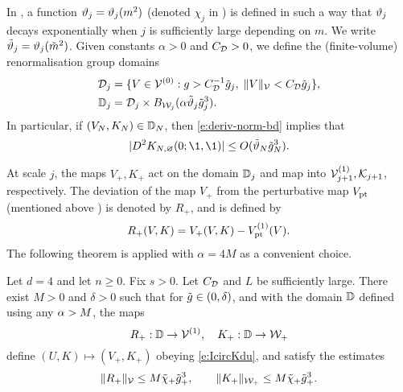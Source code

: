 In \cite[\eqref{log-e:mass-scale}--\eqref{log-e:chidef}]{BBS-saw4-log},
a function $\vartheta_j = \vartheta_j(m^2)$ (denoted $\chi_j$ in \cite{BBS-saw4-log})
is defined in such a way that $\vartheta_j$ decays exponentially
when $j$ is sufficiently large depending on $m$.
We write $\tilde{\vartheta}_j = \vartheta_j(\tilde{m}^2)$.
Given constants $\alpha > 0$ and $C_{\mathcal{D}} > 0$,
we define the (finite-volume)
renormalisation group domains
\begin{align}
\label{e:DVdef}
\mathcal{D}_j
	&=
\{ V\in \mathcal{V}^{(0)} :
	g> C_{\mathcal{D}}^{-1} \tilde{g}_j  , \;  \|V\|_{\mathcal{V}} < C_{\mathcal{D}} \tilde{g}_j \}, \\
\label{e:domRG}
\mathbb{D}_j
	&=
\mathcal{D}_j \times B_{\mathcal{W}_j}(\alpha \tilde{\vartheta}_j \tilde{g}_j^3).
\end{align}
In particular, if $(V_N, K_N) \in \mathbb{D}_N$, then \eqref{e:deriv-norm-bd} implies that
\begin{equation}
\label{e:Kderiv-bd}
|D^2 K_{N,\varnothing}(0; \1, \1)|
	\le
O(\chicCovgen_N \ggen_N^3).
\end{equation}

At scale $j$, the maps $V_+,K_+$ act on the domain $\mathbb{D}_j$
and map into $\mathcal{V}_{j+1}^{(1)},\mathcal{K}_{j+1}$, respectively.
The deviation of the map $V_+$ from the perturbative map $V_{\rm pt}$ (mentioned above )
is denoted by $R_+$, and is defined by
\begin{equation}
\label{e:Rplusdef}
    R_+(V,K) = V_+(V,K) -V_{\rm pt}^{(1)}(V).
\end{equation}
The following theorem is applied with $\alpha =4M$ as a convenient choice.

\begin{theorem}
\label{thm:step-mr-fv}
Let $d = 4$ and let $n \ge 0$. Fix $s > 0$.
Let $C_{\mathcal{D}}$ and $L$ be sufficiently large.
There exist $M>0$ and $\delta >0$ such that
for $\tilde{g} \in (0,\delta)$, %
and with the domain
$\mathbb{D}$ defined using any $\alpha> M$, the maps
\begin{equation}
\label{e:RKplusmaps}
R_+:\domRG %
\to \Vcal^{(1)},
\quad
K_+:\domRG %
\to \Wcal_{+}%
\end{equation}
define $(U,K)\mapsto (V_+,K_+)$ obeying \eqref{e:IcircKdu},
and satisfy the estimates
\begin{equation}
\label{e:RKplus}
\|R_+\|_{\mathcal{V}}
\le
M\tilde{\chi}_+\tilde{g}_+^{3}
, \qquad
\|K_+\|_{\mathcal{W}_+}
\le
M\tilde{\chi}_+ \tilde{g}_+^{3}
.
\end{equation}
\end{theorem}

